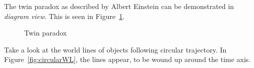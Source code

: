 \documentclass{egpubl}
\begin{document}
The twin paradox as described by Albert Einstein can be demonstrated in \emph{diagram view}. This is seen in Figure~\ref{fig:twinParadox}.

\begin{figure}[h]
\center
{}
\caption{Twin paradox}
\label{fig:twinParadox}
\end{figure}

Take a look at the world lines of objects following circular trajectory. 
In Figure~\ref{fig:circularWL}, the lines appear, to be wound up around the time axis.
\end{document}
